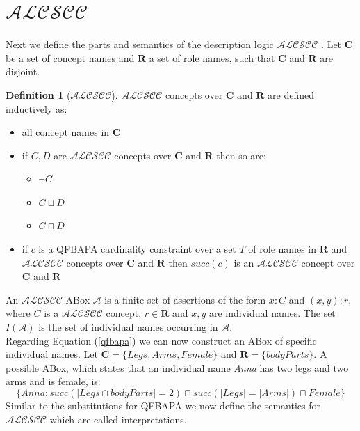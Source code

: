 \documentclass{book}
\theoremstyle{break}
\theoremstyle{definition}
\newtheorem{mydef}{Definition}
\begin{document}
\section{$\mathcal{ALCSCC}$} \label{alcscc}
Next we define the parts and semantics of the description logic $\mathcal{ALCSCC}$ \cite{4}. Let $\mathbf{C}$ be a set of concept names and $\mathbf{R}$ a set of role names, such that $\mathbf{C}$ and $\mathbf{R}$ are disjoint.
\begin{mydef}[$\mathcal{ALCSCC}$]
$\mathcal{ALCSCC}$ concepts over $\mathbf{C}$ and $\mathbf{R}$ are defined inductively as:
\begin{itemize}
\item all concept names in $\mathbf{C}$
\item if $C,D$ are $\mathcal{ALCSCC}$ concepts over $\mathbf{C}$ and $\mathbf{R}$ then so are:
\begin{itemize}
\item $\neg C$
\item $C\sqcup D$ 
\item $C\sqcap D$
\end{itemize}
\item if $c$ is a QFBAPA cardinality constraint over a set $T$ of role names in $\mathbf{R}$ and $\mathcal{ALCSCC}$ concepts over $\mathbf{C}$ and $\mathbf{R}$ then $succ(c)$ is an $\mathcal{ALCSCC}$ concept over $\mathbf{C}$ and $\mathbf{R}$
\end{itemize}
\end{mydef}
An $\mathcal{ALCSCC}$ ABox $\mathcal{A}$ is a finite set of assertions of the form $x:C$ and $(x,y):r$, where $C$ is a $\mathcal{ALCSCC}$ concept, $r\in\mathbf{R}$ and $x,y$ are individual names. The set $I(\mathcal{A})$ is the set of individual names occurring in $\mathcal{A}$.\\
Regarding Equation (\ref{qfbapa}) we can now construct an ABox of specific individual names. Let $\mathbf{C}=\{Legs, Arms, Female\}$ and $\mathbf{R}=\{bodyParts\}$. A possible ABox, which states that an individual name \textit{Anna} has two legs and two arms and is female, is:
\begin{equation}
\{Anna:succ(|Legs\cap bodyParts|=2)\sqcap succ(|Legs|=|Arms|)\sqcap Female\}
\end{equation}
Similar to the substitutions for QFBAPA we now define the semantics for $\mathcal{ALCSCC}$ which are called interpretations.
\end{document}
